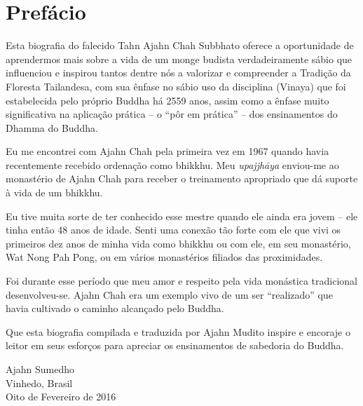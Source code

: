 \chapter{Prefácio}

\enlargethispage{\baselineskip}

Esta biografia do falecido Tahn Ajahn Chah Subbhato oferece a oportunidade de
aprendermos mais sobre a vida de um monge budista verdadeiramente sábio que
influenciou e inspirou tantos dentre nós a valorizar e compreender a Tradição da
Floresta Tailandesa, com sua ênfase no sábio uso da disciplina (Vinaya) que foi
estabelecida pelo próprio Buddha há 2559 anos, assim como a ênfase muito
significativa na aplicação prática -- o ``pôr em prática'' -- dos ensinamentos
do Dhamma do Buddha.

Eu me encontrei com Ajahn Chah pela primeira vez em 1967 quando havia
recentemente recebido ordenação como bhikkhu. Meu \emph{upajjhāya} enviou-me ao
monastério de Ajahn Chah para receber o treinamento apropriado que dá suporte à
vida de um bhikkhu.

Eu tive muita sorte de ter conhecido esse mestre quando ele ainda era jovem --
ele tinha então 48 anos de idade. Senti uma conexão tão forte com ele que vivi
os primeiros dez anos de minha vida como bhikkhu ou com ele, em seu monastério,
Wat Nong Pah Pong, ou em vários monastérios filiados das proximidades.

Foi durante esse período que meu amor e respeito pela vida monástica tradicional
desenvolveu-se. Ajahn Chah era um exemplo vivo de um ser ``realizado'' que havia
cultivado o caminho alcançado pelo Buddha.

Que esta biografia compilada e traduzida por Ajahn Mudito inspire e encoraje o
leitor em seus esforços para apreciar os ensinamentos de sabedoria do Buddha.

\bigskip

{\raggedleft
Ajahn Sumedho\\
Vinhedo, Brasil\\
Oito de Fevereiro de 2016
\par}
